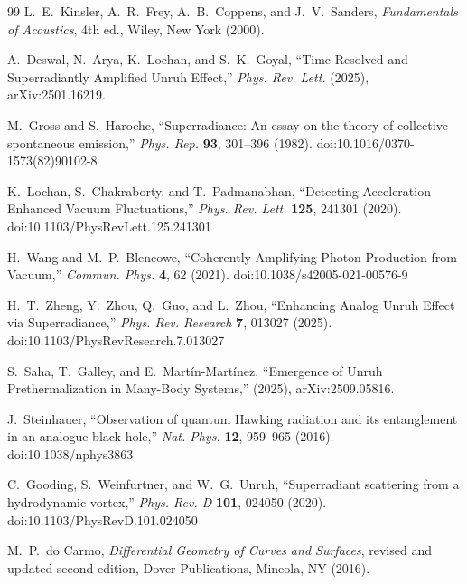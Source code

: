 \begin{thebibliography}{99}
    L.~E.~Kinsler, A.~R.~Frey, A.~B.~Coppens, and J.~V.~Sanders,
    \textit{Fundamentals of Acoustics}, 4th ed.,
    Wiley, New York (2000).

    A.~Deswal, N.~Arya, K.~Lochan, and S.~K.~Goyal,
    ``Time-Resolved and Superradiantly Amplified Unruh Effect,''
    \textit{Phys. Rev. Lett.} (2025), arXiv:2501.16219.

    M.~Gross and S.~Haroche,
    ``Superradiance: An essay on the theory of collective spontaneous emission,''
    \textit{Phys. Rep.} \textbf{93}, 301--396 (1982).
    doi:10.1016/0370-1573(82)90102-8

    K.~Lochan, S.~Chakraborty, and T.~Padmanabhan,
    ``Detecting Acceleration-Enhanced Vacuum Fluctuations,''
    \textit{Phys. Rev. Lett.} \textbf{125}, 241301 (2020).
    doi:10.1103/PhysRevLett.125.241301

    H.~Wang and M.~P.~Blencowe,
    ``Coherently Amplifying Photon Production from Vacuum,''
    \textit{Commun. Phys.} \textbf{4}, 62 (2021).
    doi:10.1038/s42005-021-00576-9



    H.~T.~Zheng, Y.~Zhou, Q.~Guo, and L.~Zhou,
    ``Enhancing Analog Unruh Effect via Superradiance,''
    \textit{Phys. Rev. Research} \textbf{7}, 013027 (2025).
    doi:10.1103/PhysRevResearch.7.013027

    S.~Saha, T.~Galley, and E.~Mart\'in-Mart\'inez,
    ``Emergence of Unruh Prethermalization in Many-Body Systems,''
    (2025), arXiv:2509.05816.

    J.~Steinhauer,
    ``Observation of quantum Hawking radiation and its entanglement in an analogue black hole,''
    \textit{Nat. Phys.} \textbf{12}, 959--965 (2016).
    doi:10.1038/nphys3863

    C.~Gooding, S.~Weinfurtner, and W.~G.~Unruh,
    ``Superradiant scattering from a hydrodynamic vortex,''
    \textit{Phys. Rev. D} \textbf{101}, 024050 (2020).
    doi:10.1103/PhysRevD.101.024050

    M.~P.~do Carmo,
    \textit{Differential Geometry of Curves and Surfaces},
    revised and updated second edition,
    Dover Publications, Mineola, NY (2016).


\end{thebibliography}
